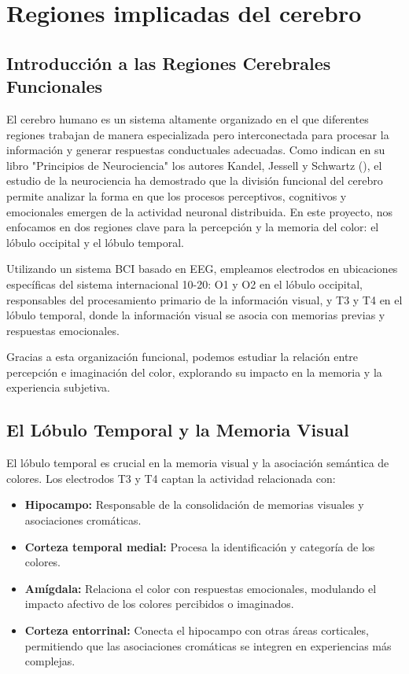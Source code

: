 \chapter{Regiones implicadas del cerebro}\label{ch:brain_regions}

\section{Introducción a las Regiones Cerebrales Funcionales}

El cerebro humano es un sistema altamente organizado en el que diferentes regiones trabajan de manera especializada pero interconectada para procesar la información y generar respuestas conductuales adecuadas. Como indican en su libro "Principios de Neurociencia" los autores Kandel, Jessell y Schwartz (\citeyear{Kandel_Jessell_Schwartz_2001}), el estudio de la neurociencia ha demostrado que la división funcional del cerebro permite analizar la forma en que los procesos perceptivos, cognitivos y emocionales emergen de la actividad neuronal distribuida. En este proyecto, nos enfocamos en dos regiones clave para la percepción y la memoria del color: el lóbulo occipital y el lóbulo temporal. 

Utilizando un sistema BCI basado en EEG, empleamos electrodos en ubicaciones específicas del sistema internacional 10-20: O1 y O2 en el lóbulo occipital, responsables del procesamiento primario de la información visual, y T3 y T4 en el lóbulo temporal, donde la información visual se asocia con memorias previas y respuestas emocionales. 

Gracias a esta organización funcional, podemos estudiar la relación entre percepción e imaginación del color, explorando su impacto en la memoria y la experiencia subjetiva.

\newpage

\section{El Lóbulo Temporal y la Memoria Visual}

El lóbulo temporal es crucial en la memoria visual y la asociación semántica de colores. Los electrodos T3 y T4 captan la actividad relacionada con:

\begin{itemize}
    \item \textbf{Hipocampo:} Responsable de la consolidación de memorias visuales y asociaciones cromáticas.
    \item \textbf{Corteza temporal medial:} Procesa la identificación y categoría de los colores.
    \item \textbf{Amígdala:} Relaciona el color con respuestas emocionales, modulando el impacto afectivo de los colores percibidos o imaginados.
    \item \textbf{Corteza entorrinal:} Conecta el hipocampo con otras áreas corticales, permitiendo que las asociaciones cromáticas se integren en experiencias más complejas.
\end{itemize}


